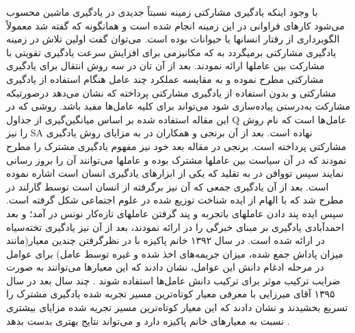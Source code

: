 \documentclass[12pt,a4paper]{article}
\begin{document}
با وجود اینکه یادگیری مشارکتی زمینه نسبتاً جدیدی در یادگیری ماشین محسوب می‌شود کارهای فراوانی در این زمینه انجام
شده است و همانگونه که گفته شد معمولاً الگوبرداری از رفتار انسانها یا حیوانات بوده است. می‌توان گفت اولین تلاش در زمینه
یادگیری مشارکتی برمیگردد به  که مکانیزمی برای افزایش سرعت یادگیری تقویتی با مشارکت بین عاملها ارائه نمودند.
بعد از آن تان در  سه روش انتقال برای یادگیری مشارکتی مطرح نموده و به مقایسه عملکرد چند عامل هنگام استفاده از یادگیری
مشارکتی و بدون استفاده از یادگیری مشارکتی پرداخته که نشان می‌دهد درصورتیکه مشارکت به‌درستی پیاده‌سازی شود می‌تواند
برای کلیه عامل‌ها مفید باشد. روشی که در این مقاله استفاده شده بر اساس میانگین‌گیری از جداول Q عامل‌ها است که نام روش را
نیز SA نهاده است. بعد از آن برنجی و همکاران در  به مزایای روش یادگیری مشارکتی پرداخته است.
برنجی در مقاله بعد خود
نیز مفهوم یادگیری مشترک را مطرح نمودند که در آن سیاست بین عاملها مشترک بوده و عاملها می‌توانند آن را بروز رسانی
نمایند  سپس تووافن در  به تقلید که یکی از ابزارهای یادگیری انسان است اشاره نموده است. بعد از آن یادگیری جمعی
که آن نیز برگرفته از انسان است توسط گارلند در  مطرح شد که با الهام از ایده شناخت توزیع شده در علوم اجتماعی شکل گرفته
است. سپس ایده پند دادن عاملهای باتجربه و پند گرفتن عاملهای تازه‌کار نونس در  آمد؛ و بعد احمدآبادی یادگیری بر مبنای
خبرگی را در  ارائه نمودند، بعد از آن نیز یادگیری تخته‌سیاه در  ارائه شده است.
در سال ۱۳۹۲ خانم پاکیزه با در نظرگرفتن چندین معیار(مانند میزان پاداش جمع شده، میزان جریمه‌های اخذ شده و غیره توسط عامل) برای عوامل در مرحله ادغام دانش این عوامل، نشان دادند که این معیارها می‌توانند به صورت ضرایب ترکیب موثر برای ترکیب دانش عامل‌ها استفاده شوند . چند سال بعد در سال ۱۳۹۵ آقای میرزایی با معرفی معیار کوتاه‌ترین مسیر تجربه شده یادگیری مشترک را تسریع بخشیدند و نشان دادند که این معیار کوتاه‌ترین مسیر تجریه شده مزایای بیشتری نسبت به معیارهای خانم پاکیزه دارد و می‌تواند نتایج بهتری بدست بدهد .
\end{document}
